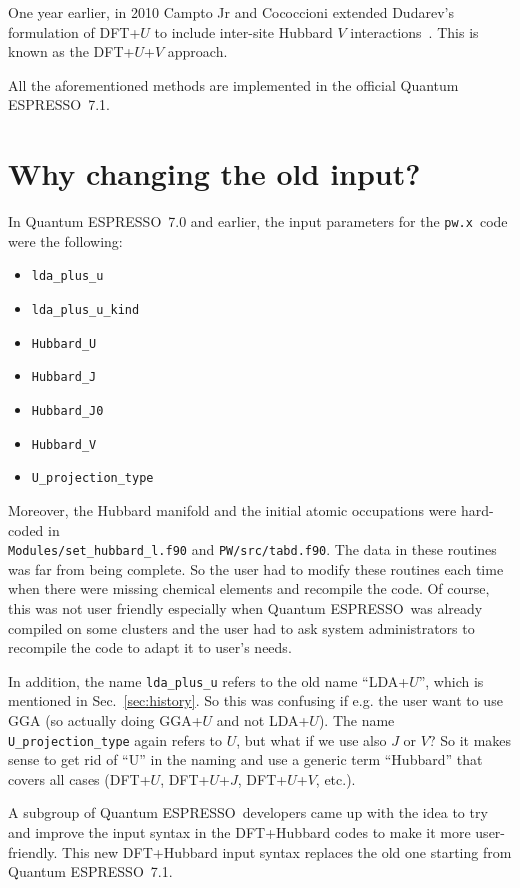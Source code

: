 \documentclass[12pt,a4paper]{article}
\def\version{7.1}
\def\qe{{\sc Quantum ESPRESSO}}
\def\pw{\texttt{pw.x}}
\begin{document}
One year earlier, in 2010 Campto Jr and Cococcioni extended Dudarev's formulation of DFT+$U$ to include inter-site Hubbard $V$ interactions~\cite{Campo:2010}. This is known as the DFT+$U$+$V$ approach.

All the aforementioned methods are implemented in the official \qe\ \version.


\section{Why changing the old input?}

In \qe\ 7.0 and earlier, the input parameters for the \pw\ code were the following:
\begin{itemize}
    \item \texttt{lda\_plus\_u}
    \item \texttt{lda\_plus\_u\_kind}
    \item \texttt{Hubbard\_U}
    \item \texttt{Hubbard\_J}
    \item \texttt{Hubbard\_J0}
    \item \texttt{Hubbard\_V}
    \item \texttt{U\_projection\_type}
\end{itemize}

Moreover, the Hubbard manifold and the initial atomic occupations were hard-coded in\\ \texttt{Modules/set\_hubbard\_l.f90} and \texttt{PW/src/tabd.f90}. The data in these routines was far from being complete. So the user had to modify these routines each time when there were missing chemical elements and recompile the code. Of course, this was not user friendly especially when \qe\ was already compiled on some clusters and the user had to ask system administrators to recompile the code to adapt it to user's needs. 

In addition, the name \texttt{lda\_plus\_u} refers to the old name ``LDA+$U$'', which is mentioned in Sec.~\ref{sec:history}. So this was confusing if e.g. the user want to use GGA (so actually doing GGA+$U$ and not LDA+$U$). The name \texttt{U\_projection\_type} again refers to $U$, but what if we use also $J$ or $V$? So it makes sense to get rid of ``U'' in the naming and use a generic term ``Hubbard'' that covers all cases (DFT+$U$, DFT+$U$+$J$, DFT+$U$+$V$, etc.).

A subgroup of \qe\ developers came up with the idea to try and improve the input syntax in the DFT+Hubbard codes to make it more user-friendly. This new DFT+Hubbard input syntax replaces the old one starting from \qe\ \version.
\end{document}
